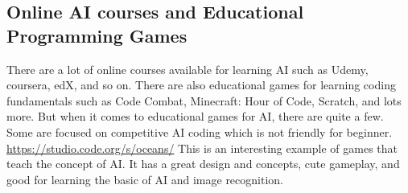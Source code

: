 \medskip
\subsection{Online AI courses and Educational Programming Games}
There are a lot of online courses available for learning AI such as Udemy, coursera, edX, and so on. There are also educational games for learning coding fundamentals such as Code Combat, Minecraft: Hour of Code, Scratch, and lots more. But when it comes to educational games for AI, there are quite a few. Some are focused on competitive AI coding which is not friendly for beginner. \\
\url{https://studio.code.org/s/oceans/} This is an interesting example of games that teach the concept of AI. It has a great design and concepts, cute gameplay, and good for learning the basic of AI and image recognition.